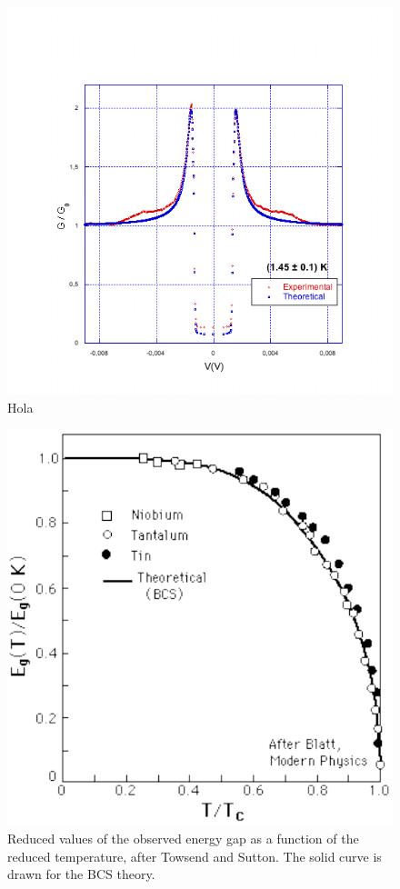 \begin{figure}[h!]
\centering
\includegraphics[scale=0.4]{graph5}
\caption{Hola\label{graph5}}
\end{figure}

\begin{figure}[h!]
\centering
\includegraphics[scale=0.6]{bcs_gap2}
\caption{\small Reduced values of the observed energy gap as a function of the reduced temperature, after Towsend and Sutton. The solid curve is drawn for the BCS theory. \label{bcs_gap}}
\end{figure}


